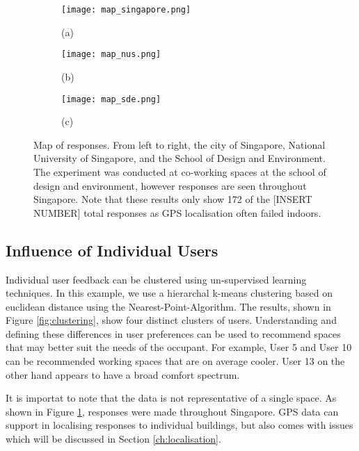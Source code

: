 \begin{figure}
    \centering
    \begin{subfigure}[t]{0.3\textwidth}
        \centering
        \texttt{[image: map\_singapore.png]}
        \caption{(a)}
    \end{subfigure}
    \begin{subfigure}[t]{0.3\textwidth}
        \centering
        \texttt{[image: map\_nus.png]}
        \caption{(b)}
    \end{subfigure}
    \begin{subfigure}[t]{0.3\textwidth}
        \centering
        \texttt{[image: map\_sde.png]}
        \caption{(c)}
    \end{subfigure}
    \caption{Map of responses. From left to right, the city of Singapore, National University of Singapore, and the School of Design and Environment. The experiment was conducted at co-working spaces at the school of design and environment, however responses are seen throughout Singapore. Note that these results only show 172 of the [INSERT NUMBER] total responses as GPS localisation often failed indoors.}
    \label{fig:map}
\end{figure}


\subsection{Influence of Individual Users}
\label{ch:userResults}

Individual user feedback can be clustered using un-supervised learning techniques. In this example, we use a hierarchal k-means clustering based on euclidean distance using the Nearest-Point-Algorithm. The results, shown in Figure \ref{fig:clustering}, show four distinct clusters of users. 
Understanding and defining these differences in user preferences can be used to recommend spaces that may better suit the needs of the occupant. For example, User 5 and User 10 can be recommended working spaces that are on average cooler. User 13 on the other hand appears to have a broad comfort spectrum. 

It is importat to note that the data is not representative of a single space. As shown in Figure \ref{fig:map}, responses were made throughout Singapore. GPS data can support in localising responses to individual buildings, but also comes with issues which will be discussed in Section \ref{ch:localisation}.


